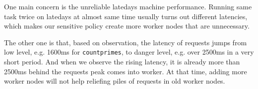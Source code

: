 \documentclass[11pt]{article}
\newcommand{\code}[1]{\texttt{#1}}
\begin{document}
One main concern is the unreliable latedays machine performance.
Running same task twice on latedays at almost same time usually turns out different latencies, which makes our sensitive policy create more worker nodes that are unnecessary.

The other one is that, based on observation, the latency of requests jumps from low level, e.g. 1600ms for \code{countprimes}, to danger level, e.g. over 2500ms in a very short period.
And when we observe the rising latency, it is already more than 2500ms behind the requests peak comes into worker.
At that time, adding more worker nodes will not help reliefing piles of requests in old worker nodes.
\end{document}
